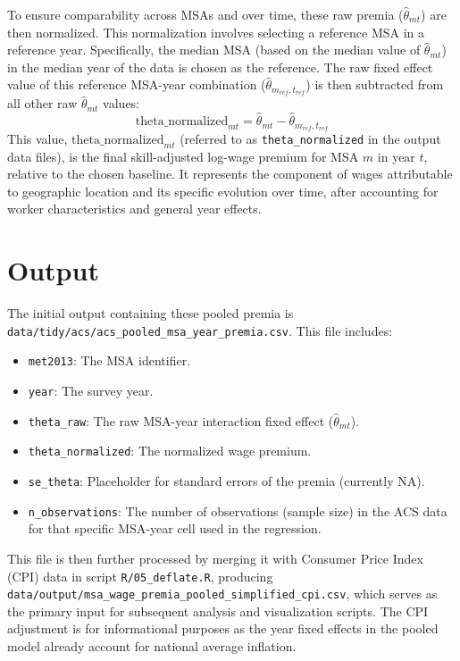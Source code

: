 \documentclass{article}
\begin{document}
To ensure comparability across MSAs and over time, these raw premia ($\hat{\theta}_{mt}$) are then normalized. This normalization involves selecting a reference MSA in a reference year. Specifically, the median MSA (based on the median value of $\hat{\theta}_{mt}$) in the median year of the data is chosen as the reference. The raw fixed effect value of this reference MSA-year combination ($\hat{\theta}_{m_{ref}, t_{ref}}$) is then subtracted from all other raw $\hat{\theta}_{mt}$ values:
\begin{equation}
    \text{theta\_normalized}_{mt} = \hat{\theta}_{mt} - \hat{\theta}_{m_{ref}, t_{ref}}
\end{equation}
This value, $\text{theta\_normalized}_{mt}$ (referred to as \texttt{theta\_normalized} in the output data files), is the final skill-adjusted log-wage premium for MSA $m$ in year $t$, relative to the chosen baseline. It represents the component of wages attributable to geographic location and its specific evolution over time, after accounting for worker characteristics and general year effects.

\section{Output}
The initial output containing these pooled premia is \texttt{data/tidy/acs/acs\_pooled\_msa\_year\_premia.csv}. This file includes:
\begin{itemize}
    \item \texttt{met2013}: The MSA identifier.
    \item \texttt{year}: The survey year.
    \item \texttt{theta\_raw}: The raw MSA-year interaction fixed effect ($\hat{\theta}_{mt}$).
    \item \texttt{theta\_normalized}: The normalized wage premium.
    \item \texttt{se\_theta}: Placeholder for standard errors of the premia (currently NA).
    \item \texttt{n\_observations}: The number of observations (sample size) in the ACS data for that specific MSA-year cell used in the regression.
\end{itemize}
This file is then further processed by merging it with Consumer Price Index (CPI) data in script \texttt{R/05\_deflate.R}, producing \texttt{data/output/msa\_wage\_premia\_pooled\_simplified\_cpi.csv}, which serves as the primary input for subsequent analysis and visualization scripts. The CPI adjustment is for informational purposes as the year fixed effects in the pooled model already account for national average inflation.
\end{document}
